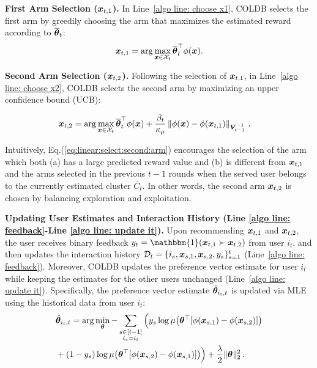 \squishlisttwo
    \item \textbf{First Arm Selection ($\boldsymbol{x}_{t,1}$).} In Line~\ref{algo line: choose x1}, COLDB selects the first arm by greedily choosing the arm that maximizes the estimated reward according to $\overline{\boldsymbol{\theta}}_t$:
    \begin{equation}
        \boldsymbol{x}_{t,1} = \arg\max_{\boldsymbol{x} \in \mathcal{X}_t} \overline{\boldsymbol{\theta}}_t^\top \phi(\boldsymbol{x}).
    \end{equation}
    \item \textbf{Second Arm Selection ($\boldsymbol{x}_{t,2}$).} Following the selection of $\boldsymbol{x}_{t,1}$, in Line~\ref{algo line: choose x2}, COLDB selects the second arm by maximizing an upper confidence bound (UCB):
\begin{small}
    \begin{align}
    \boldsymbol{x}_{t,2} &= \arg\max_{\boldsymbol{x}\in\mathcal{X}_t} \overline{\boldsymbol{\theta}}_t^\top \phi(\boldsymbol{x}) + \frac{\beta_t}{\kappa_\mu}\left\| \phi(\boldsymbol{x}) - \phi(\boldsymbol{x}_{t,1}) \right\|_{\boldsymbol{V}_{t-1}^{-1}}\,.
\label{eq:linear:select:second:arm}
\end{align}
\end{small}
Intuitively, Eq.(\ref{eq:linear:select:second:arm}) encourages the selection of the arm which both (a) has a large predicted reward value and (b) is different from $\boldsymbol{x}_{t,1}$ and the arms selected in the previous $t-1$ rounds when the served user belongs to the currently estimated cluster $\overline{C}_t$.
In other words, the second arm $\boldsymbol{x}_{t,2}$ is chosen by balancing exploration and exploitation.
\squishend

\noindent\textbf{Updating User Estimates and Interaction History (Line \ref{algo line: feedback}-Line \ref{algo line: update it}).} Upon recommending $\boldsymbol{x}_{t,1}$ and $\boldsymbol{x}_{t,2}$, the user receives binary feedback $y_t = \mathbbm{1}(\bx_{t,1} \succ \bx_{t,2})$ from user $i_t$, and then updates the interaction history $\mathcal{D}_t = \{i_s, \boldsymbol{x}_{s,1}, \boldsymbol{x}_{s,2}, y_s\}_{s=1}^t$ (Line~\ref{algo line: feedback}). Moreover, COLDB updates the preference vector estimate for user $i_t$ while keeping the estimates for the other users unchanged (Line~\ref{algo line: update it}). Specifically, the preference vector estimate $\hat{\boldsymbol{\theta}}_{i_t,t}$ is updated via MLE using the historical data from user $i_t$:
\begin{align}
    &\hat{\boldsymbol{\theta}}_{i_t,t} = \arg\min_{\boldsymbol{\theta}} - \sum_{\substack{s \in [t-1] \\ i_s = i_t}} \Big( y_s \log \mu\big(\boldsymbol{\theta}^\top [\phi(\boldsymbol{x}_{s,1}) - \phi(\boldsymbol{x}_{s,2})]\big) \notag \\
    &+ (1 - y_s) \log \mu\big(\boldsymbol{\theta}^\top [\phi(\boldsymbol{x}_{s,2}) - \phi(\boldsymbol{x}_{s,1})]\big) \Big) + \frac{\lambda}{2} \|\boldsymbol{\theta}\|_2^2\,.
\end{align}

